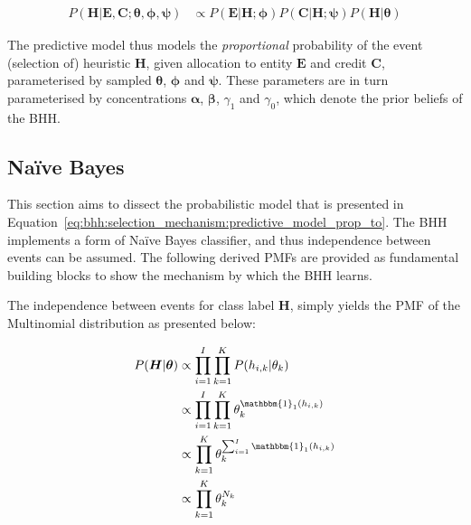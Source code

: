 \begin{equation}
      \label{eq:bhh:selection_mechanism:predictive_model_prop_to}
      \begin{split}
            P(\boldsymbol{H} \vert \boldsymbol{E}, \boldsymbol{C};  \boldsymbol{\theta}, \boldsymbol{\phi}, \boldsymbol{\psi}) &\propto P(\boldsymbol{E} \vert \boldsymbol{H};  \boldsymbol{\phi})  P(\boldsymbol{C} \vert \boldsymbol{H};  \boldsymbol{\psi}) P(\boldsymbol{H} \vert \boldsymbol{\theta})
      \end{split}
\end{equation}

The predictive model thus models the \textit{proportional} probability of the event (selection of) heuristic $\boldsymbol{H}$, given allocation to entity $\boldsymbol{E}$ and credit $\boldsymbol{C}$, parameterised by sampled $\boldsymbol{\theta}$, $\boldsymbol{\phi}$ and $\boldsymbol{\psi}$. These parameters are in turn parameterised by concentrations $\boldsymbol{\alpha}$, $\boldsymbol{\beta}$, $\gamma_{1}$ and $\gamma_{0}$, which denote the prior beliefs of the \acs{BHH}.


\subsection{Naïve Bayes}\label{sec:bhh:selection_mechanism:naive_bayes}

This section aims to dissect the probabilistic model that is presented in Equation~\eqref{eq:bhh:selection_mechanism:predictive_model_prop_to}. The \acs{BHH} implements a form of Naïve Bayes classifier, and thus independence between events can be assumed. The following derived \acp{PMF} are provided as fundamental building blocks to show the mechanism by which the \acs{BHH} learns.

The independence between events for class label $\boldsymbol{H}$, simply yields the \ac{PMF} of the Multinomial distribution as presented below:

\begin{equation}
      \label{eq:bhh:selection_mechanism:naive_bayes:h_pmf}
      \begin{split}
            P(\boldsymbol{H} \vert \boldsymbol{\theta})
            &\propto \prod_{i=1}^{I} \prod_{k=1}^{K} P(h_{i,k} \vert \theta_{k}) \\
            &\propto \prod_{i=1}^{I} \prod_{k=1}^{K} \theta_{k}^{\mathbbm{1}_{1}(h_{i,k})} \\
            &\propto \prod_{k=1}^{K} \theta_{k}^{\sum_{i=1}^{I} \mathbbm{1}_{1}(h_{i,k})} \\
            &\propto \prod_{k=1}^{K} \theta_{k}^{N_{k}}
      \end{split}
\end{equation}

